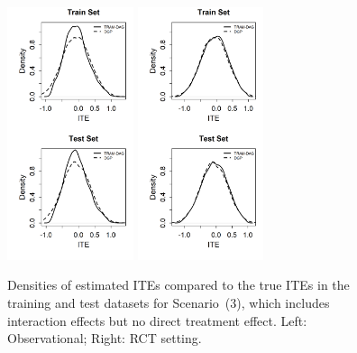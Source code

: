 \begin{figure}[htbp]
\centering
\includegraphics[width=0.33\textwidth]{img/results/observ_scenario3_ITE_densities_train_test.png}
\includegraphics[width=0.33\textwidth]{img/results/rct_scenario3_ITE_densities_train_test.png}
\vspace{-17pt}
\caption{Densities of estimated ITEs compared to the true ITEs in the training and test datasets for Scenario~(3), which includes interaction effects but no direct treatment effect. Left: Observational; Right: RCT setting.}
\label{fig:scenario3_ite_densities_train_test}
\end{figure}






